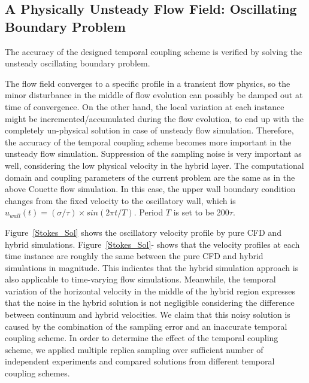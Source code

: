 \documentclass[preprint,12pt]{elsarticle}
\begin{document}
\subsection{A Physically Unsteady Flow Field: Oscillating Boundary Problem}
\label{sec:accuracy_oscillation}

The accuracy of the designed temporal coupling scheme is verified by solving the unsteady oscillating boundary problem. 

The flow field converges to a specific profile in a transient flow physics, so the minor disturbance in the middle of flow evolution can possibly be damped out at time of convergence. On the other hand, the local variation at each instance might be incremented/accumulated during the flow evolution, to end up with the completely un-physical solution in case of unsteady flow simulation. Therefore, the accuracy of the temporal coupling scheme becomes more important in the unsteady flow simulation. Suppression of the sampling noise is very important as well, considering the low physical velocity in the hybrid layer. The computational domain and coupling parameters of the current problem are the same as in the above Couette flow simulation. In this case, the upper wall boundary condition changes from the fixed velocity to the oscillatory wall, which is $u_{wall}(t)=({\sigma}/{\tau}){\times}sin(2{\pi}t/T)$. Period $T$ is set to be 200$\tau$.


Figure~\ref{Stokes_Sol} shows the oscillatory velocity profile by pure CFD and
hybrid simulations. Figure~\ref{Stokes_Sol}- shows that
the velocity profiles at each time instance are roughly the same between
the pure CFD and hybrid simulations in magnitude. This indicates that
the hybrid simulation approach is also applicable to time-varying flow
simulations. Meanwhile, the temporal variation of the horizontal velocity
in the middle of the hybrid region expresses that the noise in the hybrid
solution is not negligible considering the difference between continuum and
hybrid velocities. We claim that this noisy solution is caused by the
combination of the sampling error and an inaccurate temporal coupling scheme.
In order to determine the effect of the temporal coupling scheme, we applied
multiple replica sampling over sufficient number of independent experiments
and compared solutions from different temporal coupling schemes.

\end{document}
